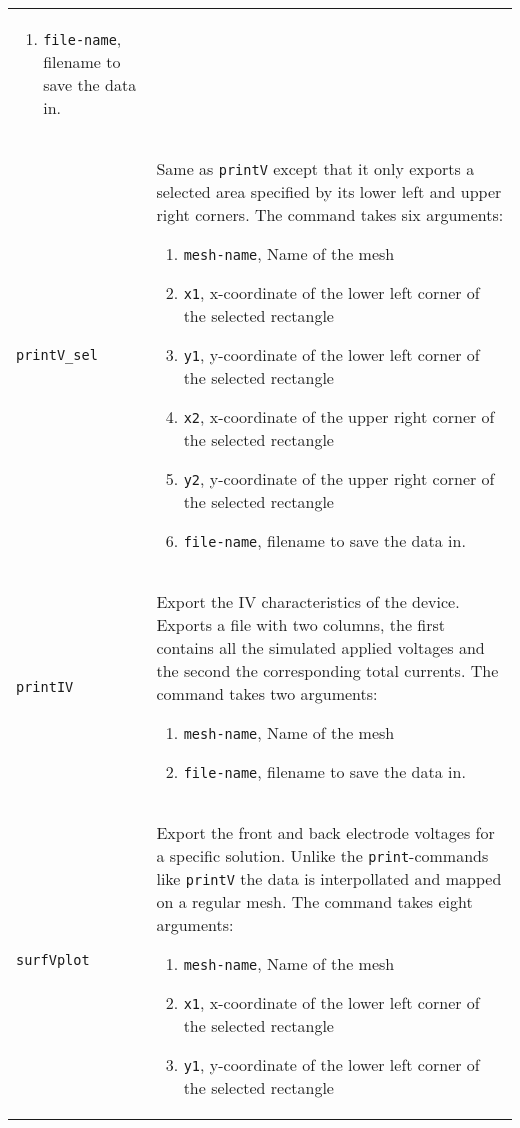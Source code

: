 \documentclass[noshowpacs,preprintnumbers,amsmath,amssymb, letter]{revtex4}
\begin{document}
\begin{longtable}{p{}p{}}
\begin{enumerate}
\item \texttt{file-name}, filename to save the data in.
\end{enumerate}\\
\texttt{printV\_sel}		& Same as \texttt{printV} except that it only exports a selected area specified by its lower left and upper right corners. The command takes six arguments:
\begin{enumerate}
\item \texttt{mesh-name}, Name of the mesh
\item \texttt{x1}, x-coordinate of the lower left corner of the selected rectangle
\item \texttt{y1}, y-coordinate of the lower left corner of the selected rectangle
\item \texttt{x2}, x-coordinate of the upper right corner of the selected rectangle
\item \texttt{y2}, y-coordinate of the upper right corner of the selected rectangle
\item \texttt{file-name}, filename to save the data in.
\end{enumerate}\\
\texttt{printIV}		& Export the IV characteristics of the device. Exports a file with two columns, the first contains all the simulated applied voltages and the second the corresponding total currents. The command takes two arguments:
\begin{enumerate}
\item \texttt{mesh-name}, Name of the mesh
\item \texttt{file-name}, filename to save the data in.
\end{enumerate}\\
\texttt{surfVplot}		& Export the front and back electrode voltages for a specific solution. Unlike the \texttt{print}-commands like \texttt{printV} the data is interpollated and mapped on a regular mesh. The command takes eight arguments:
\begin{enumerate}
\item \texttt{mesh-name}, Name of the mesh
\item \texttt{x1}, x-coordinate of the lower left corner of the selected rectangle
\item \texttt{y1}, y-coordinate of the lower left corner of the selected rectangle

\end{enumerate}
\end{longtable}
\end{document}
